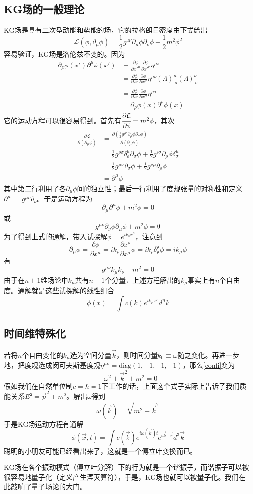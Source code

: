 \documentclass[a4paper,11pt]{ctexart}
\newcommand{\beq}{\begin{equation}}
\newcommand{\eeq}{\end{equation}}
\newcommand{\bea}{\begin{equation}\begin{aligned}}
\newcommand{\eea}{\end{aligned}\end{equation}}
\newcommand{\lag}{\mathcal{L}}
\newcommand{\diag}{\mathrm{diag}}
\begin{document}
\subsection{KG场的一般理论}
KG场是具有二次型动能和势能的场，它的拉格朗日密度由下式给出
\beq
\lag(\phi,\partial_\mu \phi) = \frac{1}{2} g^{\mu \nu} \partial_\mu \phi \partial_\nu \phi  - \frac{1}{2}m^2 \phi^2
\eeq
容易验证，KG场是洛伦兹不变的。因为
\bea
\partial_\mu \phi(x') \partial^\mu \phi(x') &= \frac{\partial \phi}{\partial x'^\mu} \frac{\partial \phi}{\partial x'^\nu} \eta^{\mu \nu} \\
&= \frac{\partial \phi}{\partial x^\rho} \frac{\partial \phi}{\partial x^\sigma} \eta^{\mu \nu} (\Lambda)^\mu_{\ \rho} (\Lambda)^\nu_{\ \sigma} \\
&= \frac{\partial \phi}{\partial x^\rho} \frac{\partial \phi}{\partial x^\sigma} \eta^{\rho \sigma} \\
&= \partial_\rho \phi(x) \partial^\rho \phi(x)
\eea
它的运动方程可以很容易得到。首先有$\cfrac{\partial \lag}{\partial \phi} = m^2 \phi$，其次
\bea
\frac{\partial \lag}{\partial (\partial_\mu \phi)} &= \frac{\partial (\frac{1}{2} g^{\rho \sigma} \partial_\rho \phi \partial_\sigma \phi)}{\partial (\partial_\mu \phi)} \\
&= \frac{1}{2} g^{\rho \sigma} \delta^\mu_\rho \partial_\sigma \phi + \frac{1}{2} g^{\rho \sigma} \partial_\rho \phi \delta^\mu_\sigma \\
&= \frac{1}{2} g^{\mu \sigma} \partial_\sigma \phi + \frac{1}{2} g^{\rho \mu} \partial_\rho \phi \\
&= \partial^\mu \phi
\eea
其中第二行利用了各$\partial_\mu \phi$间的独立性；最后一行利用了度规张量的对称性和定义$\partial^\mu \ = g^{\mu \nu} \partial_\nu$。于是运动方程为
\beq
\partial_\mu \partial^\mu \phi + m^2 \phi = 0
\eeq
或
\beq
g^{\mu \nu} \partial_\nu \phi \partial_\mu \phi + m^2 \phi = 0
\eeq
为了得到上式的通解，带入试探解$\phi=  e^{i k_\rho x^\rho}$，注意到
\beq
\partial_\mu \phi = \frac{\partial \phi}{\partial x^\mu}
= i k_\rho \frac{\partial x^\rho}{\partial x^\mu} \phi
= i k_\rho \delta^\rho_\mu \phi = ik_\mu \phi
\eeq
有
\beq \label{confi}
g^{\mu \nu} k_\mu k_\nu + m^2 = 0
\eeq
由于在$n+1$维场论中$k_\mu$共有$n+1$个分量，上述方程解出的$k_\mu$事实上有$n$个自由度。通解就是这些试探解的线性组合
\beq
\phi(x) = \int c(k) e^{i k_\mu x^\mu} d^{n}k
\eeq
\subsection{时间维特殊化}
若将$n$个自由变化的$k_\mu$选为空间分量$\vec{k}$，则时间分量$k_0 \equiv \omega$随之变化。再进一步地，把度规选成闵可夫斯基度规$\eta^{\mu \nu} = \diag (1,-1,-1,-1)$，那么\cref{confi}变为
\beq
-\omega^2 + {\vec{k}}^2 + m^2 = 0
\eeq
假如我们在自然单位制$c = \hbar = 1$下工作的话，上面这个式子实际上告诉了我们质能关系$E^2 = \vec{p}^2 + m^2$。解出$\omega$得到
\beq
\omega(\vec{k}) = \sqrt{m^2 + \vec{k}^2}
\eeq
于是KG场运动方程有通解
\beq
\phi(\vec{x},t) = \int c(\vec{k}) e^{i \omega(\vec{k}) t} e^{i \vec{k} \cdot \vec{x}} d^3 \vec{k}
\eeq
聪明的小朋友可能已经看出来了，这就是一个傅立叶变换而已。
\par
KG场在各个振动模式（傅立叶分解）下的行为就是一个谐振子，而谐振子可以被很容易地量子化（定义产生湮灭算符），于是，KG场也就可以被量子化。我们在此敲响了量子场论的大门。
\end{document}
